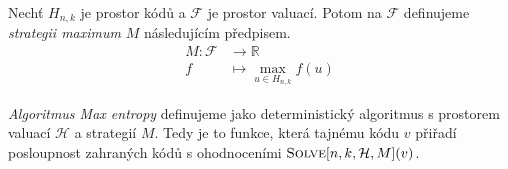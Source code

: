 \begin{definice}\label{defstrategiemaximum}
    Nechť $H_{n,k}$ je prostor kódů a $\mathcal{F}$ je prostor valuací. Potom na $\mathcal{F}$ definujeme \emph{strategii maximum} $M$ následujícím předpisem.
    \begin{align*}
        M \colon \mathcal{F} &\to \mathbb{R} \\
        f &\mapsto \max_{u\in H_{n,k}} f(u)
    \end{align*}
\end{definice}


\begin{definice}
    \emph{Algoritmus Max entropy} definujeme jako deterministický algoritmus s prostorem valuací $\mathcal{H}$ a strategií $M$. Tedy je to funkce, která tajnému kódu $v$ přiřadí posloupnost zahraných kódů s ohodnoceními $\textsc{Solve}[n, k, \mathcal{H}, M](v)$.
\end{definice}


